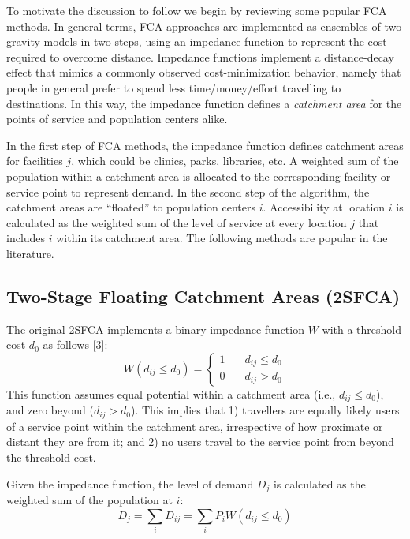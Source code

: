 \documentclass[10pt,letterpaper]{article}
\begin{document}
To motivate the discussion to follow we begin by reviewing some popular
FCA methods. In general terms, FCA approaches are implemented as
ensembles of two gravity models in two steps, using an impedance
function to represent the cost required to overcome distance. Impedance
functions implement a distance-decay effect that mimics a commonly
observed cost-minimization behavior, namely that people in general
prefer to spend less time/money/effort travelling to destinations. In
this way, the impedance function defines a \emph{catchment area} for the
points of service and population centers alike.

In the first step of FCA methods, the impedance function defines
catchment areas for facilities \(j\), which could be clinics, parks,
libraries, etc. A weighted sum of the population within a catchment area
is allocated to the corresponding facility or service point to represent
demand. In the second step of the algorithm, the catchment areas are
``floated'' to population centers \(i\). Accessibility at location \(i\)
is calculated as the weighted sum of the level of service at every
location \(j\) that includes \(i\) within its catchment area. The
following methods are popular in the literature.

\subsection{Two-Stage Floating Catchment Areas
(2SFCA)}\label{two-stage-floating-catchment-areas-2sfca}

The original 2SFCA implements a binary impedance function \(W\) with a
threshold cost \(d_0\) as follows {[}3{]}: \[
W(d_{ij}\leq d_0) = \left\{
        \begin{array}{ll}
            1 & \quad d_{ij} \leq d_0 \\
            0 & \quad d_{ij} > d_0
        \end{array}
    \right.
\] This function assumes equal potential within a catchment area (i.e.,
\(d_{ij} \leq d_0\)), and zero beyond (\(d_{ij} > d_0\)). This implies
that 1) travellers are equally likely users of a service point within
the catchment area, irrespective of how proximate or distant they are
from it; and 2) no users travel to the service point from beyond the
threshold cost.

Given the impedance function, the level of demand \(D_{j}\) is
calculated as the weighted sum of the population at \(i\): \[
D_j = \sum_i{D_{ij}} = \sum_i{P_iW(d_{ij}\leq d_0)}
\]
\end{document}
